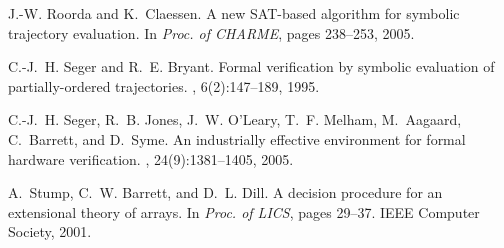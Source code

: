 \documentclass{llncs}
\begin{document}
\begin{thebibliography}{10}
J.-W. Roorda and K.~Claessen.
\newblock A new {SAT}-based algorithm for symbolic trajectory evaluation.
\newblock In {\em Proc. of CHARME}, pages 238--253, 2005.

C.-J.~H. Seger and R.~E. Bryant.
\newblock Formal verification by symbolic evaluation of partially-ordered
  trajectories.
, 6(2):147--189, 1995.

C.-J.~H. Seger, R.~B. Jones, J.~W. O'Leary, T.~F. Melham, M.~Aagaard,
  C.~Barrett, and D.~Syme.
\newblock An industrially effective environment for formal hardware
  verification.
,
  24(9):1381--1405, 2005.

A.~Stump, C.~W. Barrett, and D.~L. Dill.
\newblock A decision procedure for an extensional theory of arrays.
\newblock In {\em Proc. of LICS}, pages 29--37. IEEE Computer Society, 2001.

\end{thebibliography}
\end{document}
